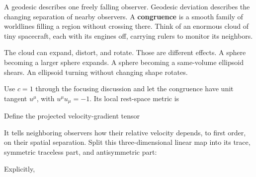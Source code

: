 \documentclass[
  11pt,
  letterpaper,
  oneside,
  openany]{scrbook}
\begin{document}
A geodesic describes one freely falling observer. Geodesic deviation
describes the changing separation of nearby observers. A
\textbf{congruence} is a smooth family of worldlines filling a region
without crossing there. Think of an enormous cloud of tiny spacecraft,
each with its engines off, carrying rulers to monitor its neighbors.

The cloud can expand, distort, and rotate. Those are different effects.
A sphere becoming a larger sphere expands. A sphere becoming a
same-volume ellipsoid shears. An ellipsoid turning without changing
shape rotates.

Use \(c=1\) through the focusing discussion and let the congruence have
unit tangent \(u^\mu\), with \(u^\mu u_\mu=-1\). Its local rest-space
metric is

\begin{center}
\begingroup
{}
\ifdim\wd\grmathbox>\linewidth
\resizebox{\linewidth}{!}{\usebox{\grmathbox}}
\else\usebox{\grmathbox}\fi
\endgroup
\end{center}

Define the projected velocity-gradient tensor

\begin{center}
\begingroup
{}
\ifdim\wd\grmathbox>\linewidth
\resizebox{\linewidth}{!}{\usebox{\grmathbox}}
\else\usebox{\grmathbox}\fi
\endgroup
\end{center}

It tells neighboring observers how their relative velocity depends, to
first order, on their spatial separation. Split this three-dimensional
linear map into its trace, symmetric traceless part, and antisymmetric
part:

\begin{center}
\begingroup
{}
\ifdim\wd\grmathbox>\linewidth
\resizebox{\linewidth}{!}{\usebox{\grmathbox}}
\else\usebox{\grmathbox}\fi
\endgroup
\end{center}

Explicitly,

\begin{center}
\begingroup
{}
\ifdim\wd\grmathbox>\linewidth
\resizebox{\linewidth}{!}{\usebox{\grmathbox}}
\else\usebox{\grmathbox}\fi
\endgroup
\end{center}
\end{document}
